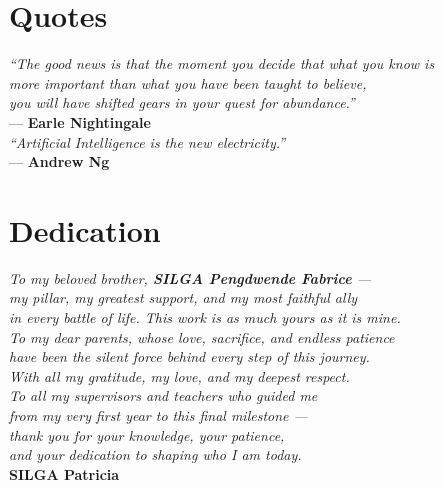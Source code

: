 \documentclass[a4paper,12pt,oneside]{report}
\begin{document}


\section*{Quotes}
\vspace*{3cm}
\begin{flushright}
\textit{``The good news is that the moment you decide that what you know is}\\
\textit{more important than what you have been taught to believe,}\\
\textit{you will have shifted gears in your quest for abundance.''}\\[0.5cm]
--- \textbf{Earle Nightingale}\\[2cm]
\textit{``Artificial Intelligence is the new electricity.''}\\[0.5cm]
--- \textbf{Andrew Ng}
\end{flushright}
\clearpage

\section*{Dedication}
\vspace*{2cm}
\begin{flushright}
\textit{To my beloved brother, \textbf{SILGA Pengdwende Fabrice} ---}\\[0.3cm]
\textit{my pillar, my greatest support, and my most faithful ally}\\
\textit{in every battle of life. This work is as much yours as it is mine.}\\[1cm]
\textit{To my dear parents, whose love, sacrifice, and endless patience}\\
\textit{have been the silent force behind every step of this journey.}\\
\textit{With all my gratitude, my love, and my deepest respect.}\\[1cm]
\textit{To all my supervisors and teachers who guided me}\\
\textit{from my very first year to this final milestone ---}\\
\textit{thank you for your knowledge, your patience,}\\
\textit{and your dedication to shaping who I am today.}\\[1.5cm]
\textbf{SILGA Patricia}
\end{flushright}
\clearpage
\end{document}
